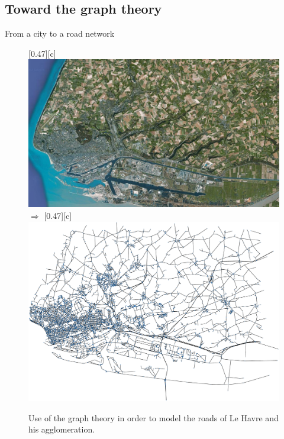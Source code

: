 \documentclass{beamer}
\begin{document}
	\subsection{Toward the graph theory}
	
\begin{frame}{From a city to a road network}
	\begin{figure}[htbp]
		\centering
		[0.47\linewidth][c]{
			\includegraphics[width=0.47\linewidth]{./img/satellite_view_le_havre.png}
		}
		$\Rightarrow$
		[0.47\linewidth][c]{
			\includegraphics[width=0.47\linewidth]{./img/screenshot_Le_Havre.pdf}
		}
		\caption{Use of the graph theory in order to model the roads of Le Havre and his agglomeration.}
		\label{fig:to_a_network}
	\end{figure}
\end{frame}
\end{document}
